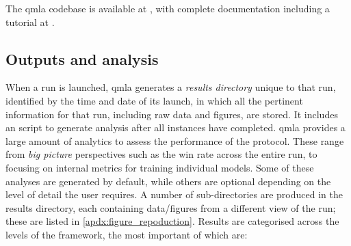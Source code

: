 The \gls{qmla} codebase is available at \cite{flynn2021QMLA},  
    with complete documentation including a tutorial at \cite{qmla_docs}. 

\subsection{Outputs and analysis}\label{sec:qmla_outputs}
When a \gls{run} is launched, \gls{qmla} generates a \emph{\gls{results directory}} unique to that \gls{run}, 
    identified by the time and date of its launch,
    in which all the pertinent information for that \gls{run}, including raw data and figures, are stored. 
It includes an  script to generate analysis after all \glspl{instance} have completed\footnotemark. 
\gls{qmla} provides a large amount of analytics to assess the performance of the protocol. 
These range from \emph{big picture} perspectives such as the  \gls{win rate}  across the entire \gls{run}, 
    to focusing on internal metrics for training individual models.
Some of these analyses are generated by default, while others are optional depending on the 
    level of detail the user requires. 
A number of sub-directories are produced in the \gls{results directory}, 
    each containing data/figures from a different view of the \gls{run};
    these are listed in \cref{apdx:figure_repoduction}.
Results are categorised across the levels of the framework, the most important of which are:

